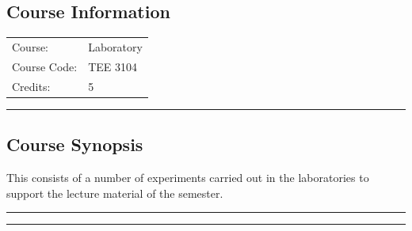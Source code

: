 
\subsection*{Course Information}
\vspace{0ex}%
\noindent\parbox{0.5\textwidth}{%
    \noindent\begin{tabular}{@{}ll}
                 \textsf{Course:}          & 	 Laboratory \\
                 \textsf{Course Code:}         & 	TEE 3104 \\
                 \textsf{Credits:}    & 	5
    \end{tabular}}
\vspace{2ex}\hrule\vspace{2ex}


\subsection*{Course Synopsis}
This consists of a number of experiments carried out in the laboratories to support the lecture material of the semester.
\vspace{2ex}\hrule
\vspace{2ex}\hrule\vspace{2ex}